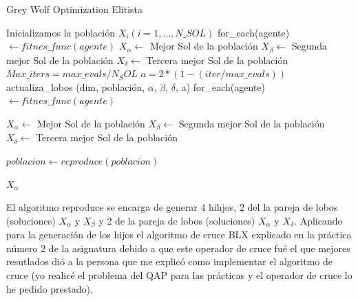 \documentclass[a4paper, 12.5pt]{report}
\begin{document}
\begin{algorithm}[H]
    \caption{Grey Wolf Optimization Elitista}\label{alg:GWO_mejorado}
    \begin{algorithmic}[1]
        \State Inicializamos la población $X_i (i=1,...,N\_SOL)$
        \State for\_each(agente) $ \gets fitnes\_func(agente)$
        \State $X_\alpha \gets$ Mejor Sol de la población
        \State $X_\beta \gets$ Segunda mejor Sol de la población
        \State $X_\delta \gets$ Tercera mejor Sol de la población
        \State $Max\_iters=max\_evals/N_SOL$
        \State $a=2*(1-(iter/max\_evals))$
        \State actualiza\_lobos (dim, población, $\alpha$, $\beta$, $\delta$, a)
        \State for\_each(agente) $ \gets fitnes\_func(agente)$

        \State $X_\alpha \gets$ Mejor Sol de la población
        \State $X_\beta \gets$ Segunda mejor Sol de la población
        \State $X_\delta \gets$ Tercera mejor Sol de la población

        \State $poblacion \gets reproduce(poblacion)$ 


        \EndFor

        \Return $X_\alpha $
        \EndFunction


    \end{algorithmic}
\end{algorithm}


El algoritmo reproduce se encarga de generar 4 hihjos, 2 del la pareja de lobos (soluciones) $X_\alpha$ y $X_\beta$ y 2 de la pareja de lobos (soluciones) $X_\alpha$ y $X_\delta$. Aplicando para la generación de los hijos el algoritmo de cruce BLX explicado en la práctica número 2 de la asignatura debido a que este operador de cruce fué el que mejores resutlados dió a la persona que me explicó como implementar el algoritmo de cruce (yo realicé el problema del QAP para las prácticas y el operador de cruce lo he pedido prestado).
\end{document}
